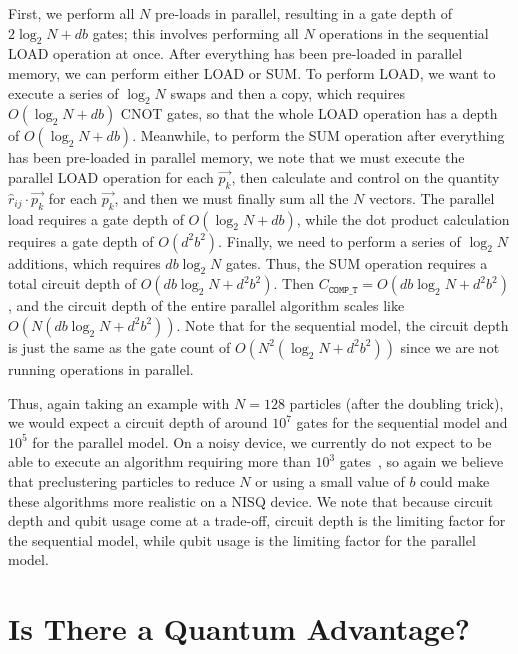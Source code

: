 \documentclass[aps,prd,twocolumn,superscriptaddress,preprintnumbers,nofootinbib,longbibliography,floatfix]{revtex4-1}
\begin{document}
First, we perform all $N$ pre-loads in parallel, resulting in a gate depth of $2\log_2 N + db$ gates; this involves performing all $N$ operations in the sequential LOAD operation at once.
%
After everything has been pre-loaded in parallel memory, we can perform either LOAD or SUM.
%
To perform LOAD, we want to execute a series of $\log_2 N$ swaps and then a copy, which requires $O(\log_2 N + db)$ CNOT gates, so that the whole LOAD operation has a depth of $O(\log_2 N + db)$.
%
Meanwhile, to perform the SUM operation after everything has been pre-loaded in parallel memory, we note that we must execute the parallel LOAD operation for each $\vec{p_k}$, then calculate and control on the quantity $\hat{r}_{ij}\cdot\vec{p_k}$ for each $\vec{p_k}$, and then we must finally sum all the $N$ vectors.
%
The parallel load requires a gate depth of $O(\log_2 N + db)$, while the dot product calculation requires a gate depth of $O(d^2b^2)$.
%
Finally, we need to perform a series of $\log_2 N$ additions, which requires $db\log_2 N$ gates.
%
Thus, the SUM operation requires a total circuit depth of $O(db\log_ 2N + d^2b^2)$.
%
Then $C_{\texttt{COMP\_T}}=O(db\log_2 N + d^2b^2)$, and the circuit depth of the entire parallel algorithm scales like $O(N(db\log_2 N+ d^2b^2))$.
%
Note that for the sequential model, the circuit depth is just the same as the gate count of $O(N^2(\log_2 N+d^2b^2))$ since we are not running operations in parallel.


Thus, again taking an example with $N=128$ particles (after the doubling trick), we would expect a circuit depth of around $10^7$ gates for the sequential model and $10^5$ for the parallel model.
%
On a noisy device, we currently do not expect to be able to execute an algorithm requiring more than $10^3$ gates~\cite{nisq}, so again we believe that preclustering particles to reduce $N$ or using a small
value of $b$ could make these algorithms more realistic on a NISQ device.
%
We note that because circuit depth and qubit usage come at a trade-off, circuit depth is the limiting factor for the sequential model, while qubit usage is the limiting factor for the parallel model. 



%
%

\section{Is There a Quantum Advantage?}
\label{sec:advantage}
\end{document}
